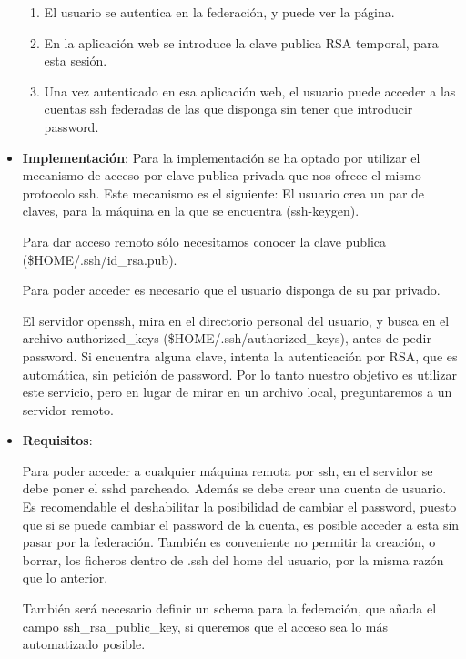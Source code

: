 \begin{itemize}
\begin{enumerate}
        \item El usuario se autentica en la federación, y puede ver la página.

        \item En la aplicación web se introduce la clave publica RSA temporal,
        para esta sesión.

        \item Una vez autenticado en esa aplicación web, el usuario puede
        acceder a las cuentas ssh federadas de las que disponga sin tener que
        introducir password.

    \end{enumerate}

    \item \textbf{Implementación}:
    Para la implementación se ha optado por utilizar el mecanismo de acceso
    por clave publica-privada que nos ofrece el mismo protocolo ssh.
    Este mecanismo es el siguiente:
    El usuario crea un par de claves, para la máquina en la que se
    encuentra (ssh-keygen).

    Para dar acceso remoto sólo necesitamos conocer la clave publica
    (\$HOME/.ssh/id\_rsa.pub).
    
    Para poder acceder es necesario que el usuario disponga de su par
    privado.
    
    El servidor openssh, mira en el directorio personal del usuario, y
    busca en el archivo authorized\_keys (\$HOME/.ssh/authorized\_keys), antes
    de pedir password. Si encuentra alguna clave, intenta la autenticación
    por RSA, que es automática, sin petición de password. Por lo tanto
    nuestro objetivo es utilizar este servicio, pero en lugar de mirar en
    un archivo local, preguntaremos a un servidor remoto.
    
    \item \textbf{Requisitos}:

    Para poder acceder a cualquier máquina remota por ssh, en el servidor
    se debe poner el sshd parcheado. Además se debe crear una cuenta de
    usuario. Es recomendable el deshabilitar la posibilidad de cambiar el
    password, puesto que si se puede cambiar el password de la cuenta, es
    posible acceder a esta sin pasar por la federación. También es
    conveniente no permitir la creación, o borrar, los ficheros dentro de
    .ssh del home del usuario, por la misma razón que lo anterior.

    También será necesario definir un schema para la federación, que añada
    el campo ssh\_rsa\_public\_key, si queremos que el acceso sea lo más
    automatizado posible.


\end{itemize}
